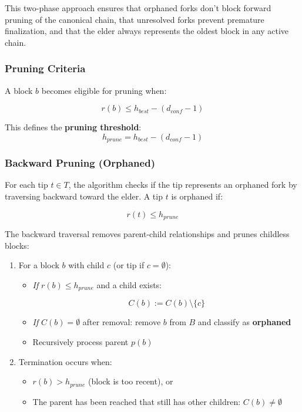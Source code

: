 This two-phase approach ensures that orphaned forks don't block forward pruning of the canonical chain, that unresolved forks prevent premature finalization, and that the elder always represents the oldest block in any active chain.

\subsubsection{Pruning Criteria}

A block $b$ becomes eligible for pruning when:

\begin{equation}
r(b) \leq h_{best} - (d_{conf} - 1)
\end{equation}

This defines the \textbf{pruning threshold}:
\begin{equation}
h_{prune} = h_{best} - (d_{conf} - 1)
\end{equation}

\subsubsection{Backward Pruning (Orphaned)}
\label{sec:fork-backward-pruning}

For each tip $t \in T$, the algorithm checks if the tip represents an orphaned fork by traversing backward toward the elder. A tip $t$ is orphaned if:

\begin{equation}
r(t) \leq h_{prune}
\end{equation}

The backward traversal removes parent-child relationships and prunes childless blocks:

\begin{enumerate}
    \item For a block $b$ with child $c$ (or tip if $c = \emptyset$):
    \begin{itemize}
        \item \textit{If} $r(b) \leq h_{prune}$ and a child exists:
        
        \[C(b) := C(b) \setminus \{c\}\]
        
        \item \textit{If} $C(b) = \emptyset$ after removal: remove $b$ from $B$ and classify as \textbf{orphaned}
        \item Recursively process parent $p(b)$
    \end{itemize}
    
    \item Termination occurs when:
    \begin{itemize}
        \item $r(b) > h_{prune}$ (block is too recent), or
        \item The parent has been reached that still has other children: $C(b) \neq \emptyset$
    \end{itemize}
\end{enumerate}

